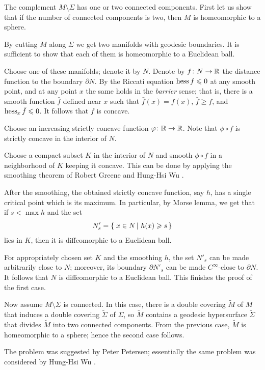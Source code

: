 The complement $M\setminus\Sigma$ has one or two connected components.
First let us show that if the number of connected components is two, 
then $M$ is homeomorphic to a sphere.

By cutting $M$ along $\Sigma$ 
we get two manifolds
with geodesic boundaries.
It is sufficient to show that each of them is homeomorphic to a Euclidean ball.

Choose one of these manifolds; denote it by $N$.
Denote by $f\:N\z\to\RR$ the distance function to the boundary $\partial N$.
By the Riccati equation $\operatorname{\rm hess}\nolimits f\leqslant 0$ at any smooth point, and at any point $x$ the same holds in the \emph{barrier} sense; that is, there is a smooth function $\bar f$ defined near $x$ such that $\bar f(x)=f(x)$, $\bar f\ge f$, and $\operatorname{\rm hess}\nolimits_x\bar f\leqslant0$.
It follows that $f$ is concave.

Choose an increasing strictly concave function $\varphi\colon\mathbb{R}\to\mathbb{R}$.
Note that $\phi\circ f$ is strictly concave in the interior of $N$.

Choose a compact subset $K$ in the interior of $N$ and
smooth $\phi\circ f$ in a neighborhood of $K$ keeping it concave. 
This can be done by applying the smoothing theorem of Robert Greene and Hung-Hsi Wu \cite[Theorem~2]{greene-wu}.

After the smoothing, the obtained strictly concave function, say $h$, has a single critical point which is its maximum.
In particular, by Morse lemma, we get that if $s<\max h$ and the set
\[N'_s=\set{x\in N}{h(x)\ge s}\]
lies in $K$, then it is diffeomorphic to a Euclidean ball.

For appropriately chosen set $K$ and the smoothing $h$, the set $N'_s$ can be made arbitrarily close to $N$;
moreover, its boundary $\partial N'_s$ can be made $C^\infty$-close to $\partial N$.
It follows that $N$ is diffeomorphic to a Euclidean ball.
This finishes the proof of the first case.

Now assume $M\setminus\Sigma$ is connected.
In this case, there is a double covering $\tilde M$ of $M$ that induces a double covering $\tilde\Sigma$ of $\Sigma$,
so $\tilde M$ contains a geodesic hypersurface $\tilde\Sigma$ that divides $\tilde M$ into two connected components. 
From the previous case, $\tilde M$ is homeomorphic to a sphere;
hence the second case follows.
\qeds

The problem was suggested by Peter Petersen;
essentially the same problem was considered by Hung-Hsi Wu \cite{wu1987}.



